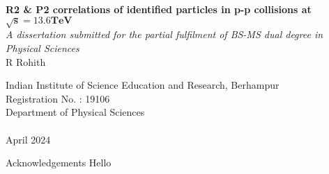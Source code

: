 \documentclass[12pt,a4paper,twoside]{report}
\newcommand{\usersetfontsize}[2]{\fontsize{#1}{#2}\selectfont}
\begin{document}
\usersetfontsize{12pt}{18pt}
\begin{titlepage}
{
	\centering
	\vspace*{2in}
	\textbf{\fontsize{16pt}{24pt}\selectfont R2 \& P2 correlations of identified particles in p-p collisions at $\mathbf{\sqrt{s}=13.6 TeV}$}%
	\\ \vspace*{0.25in}
	\textit{A dissertation submitted for the partial fulfilment of BS-MS dual degree in Physical Sciences}%
	\\ \vspace*{0.5in}
	{R Rohith}%
	\\ \vspace*{3in}
	\begin{figure}[H]
		\centering
	\end{figure}
	{\usersetfontsize{14}{21}Indian Institute of Science Education and Research, Berhampur\\Registration No. : 19106\\Department of Physical Sciences\\}~\\
	{April 2024}\\
}	
\end{titlepage}
Acknowledgements
\newpage
		Hello
\newpage
{}
\end{document}
